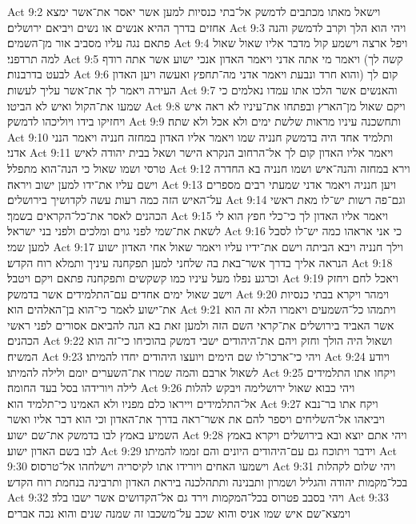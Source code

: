 Act 9:2  וישאל מאתו מכתבים לדמשק אל־בתי כנסיות למען אשר יאסר את־אשר ימצא אחזים בדרך ההיא אנשים או נשים ויביאם ירושלים׃
Act 9:3  ויהי הוא הלך וקרב לדמשק והנה פתאם נגה עליו מסביב אור מן־השמים׃
Act 9:4  ויפל ארצה וישמע קול מדבר אליו שאול שאול למה תרדפני׃
Act 9:5  ויאמר מי אתה אדני ויאמר האדון אנכי ישוע אשר אתה רודף (קשה לך לבעט בדרבנות׃
Act 9:6  והוא חרד ונבעת ויאמר אדני מה־תחפץ ואעשה ויען האדון) קום לך העירה ויאמר לך את־אשר עליך לעשות׃
Act 9:7  והאנשים אשר הלכו אתו עמדו נאלמים כי שמעו את־הקול ואיש לא הביטו׃
Act 9:8  ויקם שאול מן־הארץ ובפתחו את־עיניו לא ראה איש ויחזיקו בידו ויוליכהו לדמשק׃
Act 9:9  ותחשכנה עיניו מראות שלשת ימים ולא אכל ולא שתה׃
Act 9:10  ותלמיד אחד היה בדמשק חנניה שמו ויאמר אליו האדון במחזה חנניה ויאמר הנני אדני׃
Act 9:11  ויאמר אליו האדון קום לך אל־הרחוב הנקרא הישר ושאל בבית יהודה לאיש טרסי ושמו שאול כי הנה־הוא מתפלל׃
Act 9:12  וירא במחזה והנה־איש ושמו חנניה בא החדרה וישם עליו את־ידו למען ישוב ויראה׃
Act 9:13  ויען חנניה ויאמר אדני שמעתי רבים מספרים על־האיש הזה כמה רעות עשה לקדושיך בירושלים׃
Act 9:14  וגם־פה רשות יש־לו מאת ראשי הכהנים לאסר את־כל־הקראים בשמך׃
Act 9:15  ויאמר אליו האדון לך כי־כלי חפץ הוא לי לשאת את־שמי לפני גוים ומלכים ולפני בני ישראל׃
Act 9:16  כי אני אראהו כמה יש־לו לסבל למען שמי׃
Act 9:17  וילך חנניה ויבא הביתה וישם את־ידיו עליו ויאמר שאול אחי האדון ישוע הנראה אליך בדרך אשר־באת בה שלחני למען תפקחנה עיניך ותמלא רוח הקדש׃
Act 9:18  וכרגע נפלו מעל עיניו כמו קשקשים ותפקחנה פתאם ויקם ויטבל׃
Act 9:19  ויאכל לחם ויחזק וישב שאול ימים אחדים עם־התלמידים אשר בדמשק׃
Act 9:20  וימהר ויקרא בבתי כנסיות את־ישוע לאמר כי־הוא בן־האלהים הוא׃
Act 9:21  ויתמהו כל־השמעים ויאמרו הלא זה הוא אשר האביד בירושלים את־קראי השם הזה ולמען זאת בא הנה להביאם אסורים לפני ראשי הכהנים׃
Act 9:22  ושאול היה הולך וחזק ויהם את־היהודים ישבי דמשק בהוכיחו כי־זה הוא המשיח׃
Act 9:23  ויהי כי־ארכו־לו שם הימים ויועצו היהודים יחדו להמיתו׃
Act 9:24  ויודע לשאול ארבם והמה שמרו את־השערים יומם ולילה להמיתו׃
Act 9:25  ויקחו אתו התלמידים לילה ויורידהו בסל בעד החומה׃
Act 9:26  ויהי כבוא שאול ירושלימה ויבקש להלות אל־התלמידים וייראו כלם מפניו ולא האמינו כי־תלמיד הוא׃
Act 9:27  ויקח אתו בר־נבא ויביאהו אל־השליחים ויספר להם את אשר־ראה בדרך את־האדון וכי הוא דבר אליו ואשר השמיע באמץ לבו בדמשק את־שם ישוע׃
Act 9:28  ויהי אתם יוצא ובא בירושלים ויקרא באמץ לבו בשם האדון ישוע׃
Act 9:29  וידבר ויתוכח גם עם־היהודים היונים והם זממו להמיתו׃
Act 9:30  וישמעו האחים ויורידו אתו לקיסריה וישלחהו אל־טרסוס׃
Act 9:31  ויהי שלום לקהלות בכל־מקמות יהודה והגליל ושמרון ותבנינה ותתהלכנה ביראת האדון ותרבינה בנחמת רוח הקדש׃
Act 9:32  ויהי בסבב פטרוס בכל־המקמות וירד גם אל־הקדושים אשר ישבו בלד׃
Act 9:33  וימצא־שם איש שמו אניס והוא שכב על־משכבו זה שמנה שנים והוא נכה אברים׃
